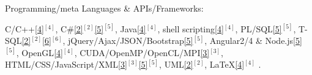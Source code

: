 \begin{cventries}

  \cventry
    {Programming/meta Languages \& APIs/Frameworks:} %
    {} %
    {} %
    {} %
    {     
      \begin{cvitems} %
        \item {
        C/C++\ref{4}{$^{[4]}$}, 
        C\#\ref{2}{$^{[2]}$}\ref{5}{$^{[5]}$}, 
        Java\ref{4}{$^{[4]}$}, 
        shell scripting\ref{4}{$^{[4]}$}, 
        PL/SQL\ref{5}{$^{[5]}$}, 
        T-SQL\ref{2}{$^{[2]}$}\ref{6}{$^{[6]}$},  
        jQuery/Ajax/JSON/Bootstrap\ref{5}{$^{[5]}$},  
        Angular2/4 \& Node.js\ref{5}{$^{[5]}$},  
        OpenGL\ref{4}{$^{[4]}$},      
        CUDA/OpenMP/OpenCL/MPI\ref{3}{$^{[3]}$},
        HTML/CSS/JavaScript/XML\ref{3}{$^{[3]}$}\ref{5}{$^{[5]}$}, 
        UML\ref{2}{$^{[2]}$},
        LaTeX\ref{4}{$^{[4]}$}%
		.}
	  \end{cvitems}
    }  
  \vspace{-0.4cm}


\end{cventries}
